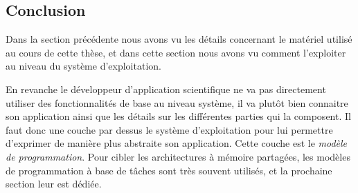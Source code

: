 \subsection*{Conclusion}

Dans la section précédente nous avons vu les détails concernant le matériel utilisé au cours de cette thèse, et dans cette section nous avons vu comment l'exploiter au niveau du système d'exploitation.

En revanche le développeur d'application scientifique ne va pas directement utiliser des fonctionnalités de base au niveau système, il va plutôt bien connaitre son application ainsi que les détails sur les différentes parties qui la composent.
Il faut donc une couche par dessus le système d'exploitation pour lui permettre d'exprimer de manière plus abstraite son application. Cette couche est le \emph{modèle de programmation}.
Pour cibler les architectures à mémoire partagées, les modèles de programmation à base de tâches sont très souvent utilisés, et la prochaine section leur est dédiée.
